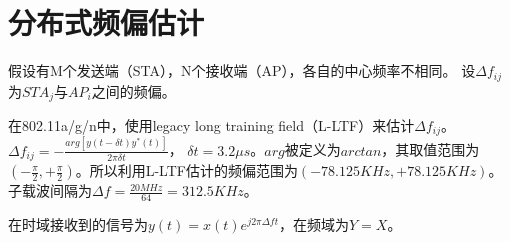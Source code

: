 
\section{分布式频偏估计}

假设有M个发送端（STA），N个接收端（AP），各自的中心频率不相同。
设$\Delta f_{ij}$为$STA_{j}$与$AP_{i}$之间的频偏。

在802.11a/g/n中，使用legacy long training field（L-LTF）来估计$\Delta f_{ij}$。
$\Delta f_{ij} = -\frac{arg[ y(t - \delta t)y^{*}(t)  ]}{2 \pi \delta t}$， $\delta t = 3.2 \mu s$。$arg$被定义为$arctan$，其取值范围为$(-\frac{\pi}{2}, +\frac{\pi}{2})$。所以利用L-LTF估计的频偏范围为$(-78.125KHz, +78.125KHz)$。
子载波间隔为$\Delta f = \frac{20MHz}{64} = 312.5KHz$。

在时域接收到的信号为$y(t)=x(t) e^{j2 \pi \Delta f t}$，在频域为$Y = X$。

